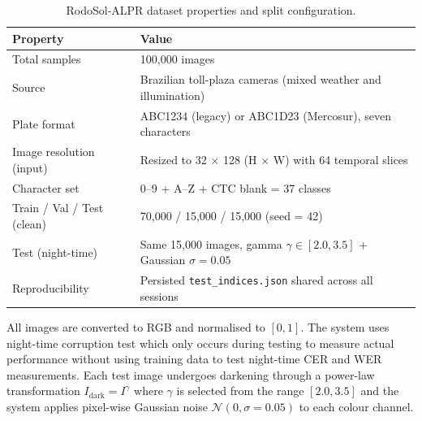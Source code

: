 \documentclass[preprint,12pt]{elsarticle}
\begin{document}
\begin{table}[h]
\centering
\caption{RodoSol-ALPR dataset properties and split configuration.}
\label{tab:dataset}
\begin{tabularx}{\columnwidth}{@{}lX@{}}
\toprule
\textbf{Property} & \textbf{Value} \\
\midrule
Total samples & 100,000 images \\
Source & Brazilian toll-plaza cameras (mixed weather and illumination) \\
Plate format & ABC1234 (legacy) or ABC1D23 (Mercosur), seven characters \\
Image resolution (input) & Resized to 32 $\times$ 128 (H $\times$ W) with 64 temporal slices \\
Character set & 0--9 + A--Z + CTC blank = 37 classes \\
Train / Val / Test (clean) & 70,000 / 15,000 / 15,000 (seed = 42) \\
Test (night-time) & Same 15,000 images, gamma $\gamma \in [2.0, 3.5]$ + Gaussian $\sigma = 0.05$ \\
Reproducibility & Persisted \texttt{test\_indices.json} shared across all sessions \\
\bottomrule
\end{tabularx}
\end{table}

All images are converted to RGB and normalised to $[0, 1]$. The system uses night-time corruption test which only occurs during testing to measure actual performance without using training data to test night-time CER and WER measurements. Each test image undergoes darkening through a power-law transformation $I_{\text{dark}} = I^\gamma$ where $\gamma$ is selected from the range $[2.0, 3.5]$ and the system applies pixel-wise Gaussian noise $\mathcal{N}(0, \sigma = 0.05)$ to each colour channel.
\end{document}
